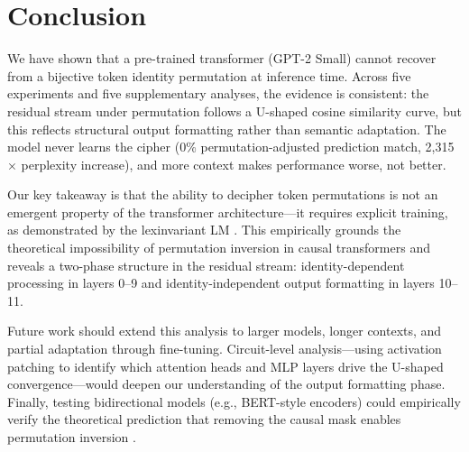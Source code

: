 \section{Conclusion}
\label{sec:conclusion}

We have shown that a pre-trained transformer (GPT-2 Small) cannot recover from a bijective token identity permutation at inference time. Across five experiments and five supplementary analyses, the evidence is consistent: the residual stream under permutation follows a U-shaped cosine similarity curve, but this reflects structural output formatting rather than semantic adaptation. The model never learns the cipher (0\% permutation-adjusted prediction match, 2,315$\times$ perplexity increase), and more context makes performance worse, not better.

Our key takeaway is that the ability to decipher token permutations is not an emergent property of the transformer architecture---it requires explicit training, as demonstrated by the lexinvariant LM \citep{huang2023lexinvariant}. This empirically grounds the theoretical impossibility of permutation inversion in causal transformers \citep{alur2025impossibility} and reveals a two-phase structure in the residual stream: identity-dependent processing in layers 0--9 and identity-independent output formatting in layers 10--11.

Future work should extend this analysis to larger models, longer contexts, and partial adaptation through fine-tuning. Circuit-level analysis---using activation patching to identify which attention heads and MLP layers drive the U-shaped convergence---would deepen our understanding of the output formatting phase. Finally, testing bidirectional models (e.g., BERT-style encoders) could empirically verify the theoretical prediction that removing the causal mask enables permutation inversion \citep{alur2025impossibility}.
